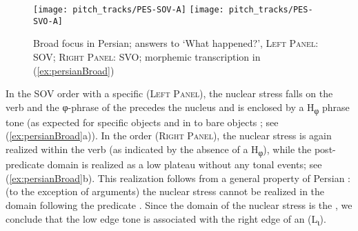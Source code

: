 \documentclass[output=paper,colorlinks,citecolor=brown]{langscibook}
\begin{document}
\begin{figure}
    \texttt{[image: pitch\_tracks/PES-SOV-A]}
    \texttt{[image: pitch\_tracks/PES-SVO-A]}
    \caption{Broad focus in Persian; answers to ‘What happened?’, \textsc{Left Panel}: SOV; \textsc{Right Panel}: SVO; morphemic transcription in (\ref{ex:persianBroad})}
    \label{fig:persianBroad}
\end{figure}

In the SOV order with a specific  (\textsc{Left Panel}), the nuclear stress falls on the verb and the φ-phrase of the  precedes the nucleus and is enclosed by a H\textsubscript{φ} phrase tone (as expected for specific objects and in  to bare objects \citep[81]{hosseini_phonology_2014}{}; see (\ref{ex:persianBroad}a)). In the  order (\textsc{Right Panel}), the nuclear stress is again realized within the verb (as indicated by the absence of a H\textsubscript{φ}), while the post-predicate domain is realized as a low plateau without any tonal events; see (\ref{ex:persianBroad}b). This realization follows from a general property of Persian : (to the exception of  arguments) the nuclear stress cannot be realized in the domain following the predicate \citep[9, 68]{sadat-tehrani_intonational_2007}. Since the domain of the nuclear stress is the , we conclude that the low edge tone is associated with the right edge of an  (L\textsubscript{ι}).
\end{document}
